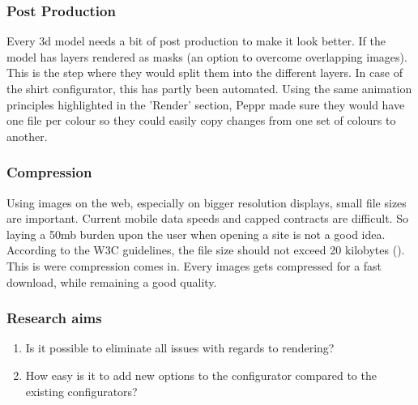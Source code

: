 \subsubsection{Post Production}
Every 3d model needs a bit of post production to make it look better. If the model has layers rendered as masks (an option to overcome overlapping images). This is the step where they would split them into the different layers. In case of the shirt configurator, this has partly been automated. Using the same animation principles highlighted in the 'Render' section, Peppr made sure they would have one file per colour so they could easily copy changes from one set of colours to another.
\newline
\subsubsection{Compression}
Using images on the web, especially on bigger resolution displays, small file sizes are important. Current mobile data speeds and capped contracts are difficult. So laying a 50mb burden upon the user when opening a site is not a good idea. According to the W3C guidelines, the file size should not exceed 20 kilobytes (\cite{pageFileSizeLimit}). This is were compression comes in. Every images gets compressed for a fast download, while remaining a good quality.

\subsubsection{Research aims}
\begin{enumerate}
	\item {Is it possible to eliminate all issues with regards to rendering?}
	\item {How easy is it to add new options to the configurator compared to the existing configurators?}
\end{enumerate}

